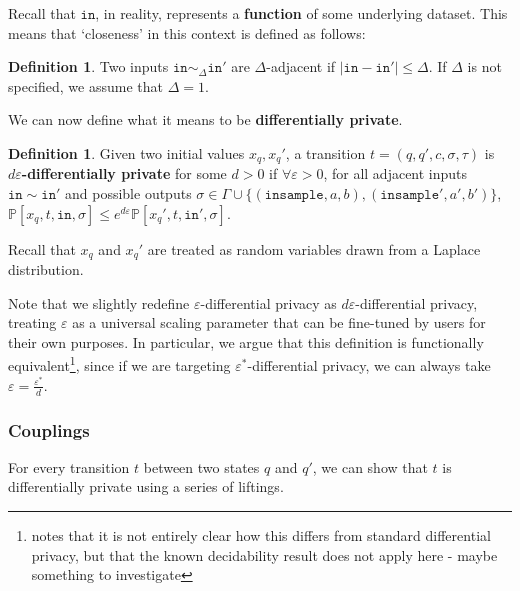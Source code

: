\documentclass[12pt]{article}
\newcommand{\PP}{\mathbb{P}}
\theoremstyle{definition}
\newtheorem{defn}[thm]{Definition}
\begin{document}
Recall that $\texttt{in}$, in reality, represents a \textbf{function} of some underlying dataset. This means that `closeness' in this context is defined as follows:

\begin{defn}
    Two inputs $\texttt{in}\sim_{\Delta} \texttt{in}'$ are $\Delta$-adjacent if $|\texttt{in}-\texttt{in}'|\leq \Delta$. If $\Delta$ is not specified, we assume that $\Delta = 1$. 
\end{defn}

We can now define what it means  to be \textbf{differentially private}.

\begin{defn}
    Given two initial values $x_q, x_q'$, a transition $t=(q, q', c, \sigma, \tau)$ is \textbf{$d\varepsilon$-differentially private} for some $d>0$ if $\forall \varepsilon> 0$, for all adjacent inputs $\texttt{in}\sim \texttt{in}'$ and possible outputs $\sigma\in \Gamma\cup\{(\texttt{insample}, a, b), (\texttt{insample}', a', b')\}$, $\PP[x_q, t, \texttt{in}, \sigma]\leq e^{d\varepsilon}\PP[x_q', t, \texttt{in}', \sigma]$. 

    Recall that $x_q$ and $x_q'$ are treated as random variables drawn from a Laplace distribution. 
\end{defn}

Note that we slightly redefine $\varepsilon$-differential privacy as $d\varepsilon$-differential privacy, treating $\varepsilon$ as a universal scaling parameter that can be fine-tuned by users for their own purposes. 
In particular, we argue that this definition is functionally equivalent\footnote{\cite{chadhaLinearTimeDecidability2021} notes that it is not entirely clear how this differs from standard differential privacy, but that the known decidability result does not apply here - {\color{red} maybe something to investigate}}, since if we are targeting $\varepsilon^*$-differential privacy, we can always take $\varepsilon = \frac{\varepsilon^*}{d}$.

\subsubsection{Couplings}

For every transition $t$ between two states $q$ and $q'$, we can show that $t$ is differentially private using a series of liftings. 
\end{document}
